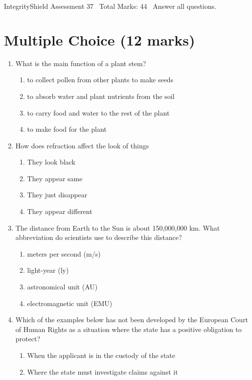 \documentclass[12pt]{article}
\begin{document}
\begin{center}
IntegrityShield Assessment 37 \
Total Marks: 44 \
Answer all questions.
\end{center}

\section*{Multiple Choice (12 marks)}
\begin{enumerate}[label=\arabic*.]
\item What is the main function of a plant stem?
\begin{enumerate}[label=(\alph*)]
    \item to collect pollen from other plants to make seeds
    \item to absorb water and plant nutrients from the soil
    \item to carry food and water to the rest of the plant
    \item to make food for the plant
\end{enumerate}
\item How does refraction affect the look of things
\begin{enumerate}[label=(\alph*)]
    \item They look black
    \item They appear same
    \item They just disappear
    \item They appear different
\end{enumerate}
\item The distance from Earth to the Sun is about 150,000,000 km. What abbreviation do scientists use to describe this distance?
\begin{enumerate}[label=(\alph*)]
    \item meters per second (m/s)
    \item light-year (ly)
    \item astronomical unit (AU)
    \item electromagnetic unit (EMU)
\end{enumerate}
\item Which of the examples below has not been developed by the European Court of Human Rights as a situation where the state has a positive obligation to protect?
\begin{enumerate}[label=(\alph*)]
    \item When the applicant is in the custody of the state
    \item Where the state must investigate claims against it

\end{enumerate}
\end{enumerate}
\end{document}
